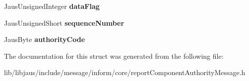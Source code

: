 \begin{DoxyCompactItemize}
\item 
\hypertarget{struct_report_component_authority_message_struct_a463f5a15caee3e97ac75b5d44e019456}{\-Jaus\-Unsigned\-Integer {\bfseries data\-Flag}}\label{struct_report_component_authority_message_struct_a463f5a15caee3e97ac75b5d44e019456}

\item 
\hypertarget{struct_report_component_authority_message_struct_ad200c4db1e37eda87c6034c3fa342771}{\-Jaus\-Unsigned\-Short {\bfseries sequence\-Number}}\label{struct_report_component_authority_message_struct_ad200c4db1e37eda87c6034c3fa342771}

\item 
\hypertarget{struct_report_component_authority_message_struct_a5306c51e456c8a1e79561ab044c86c93}{\-Jaus\-Byte {\bfseries authority\-Code}}\label{struct_report_component_authority_message_struct_a5306c51e456c8a1e79561ab044c86c93}

\end{DoxyCompactItemize}


\-The documentation for this struct was generated from the following file\-:\begin{DoxyCompactItemize}
\item 
lib/libjaus/include/message/inform/core/report\-Component\-Authority\-Message.\-h\end{DoxyCompactItemize}
